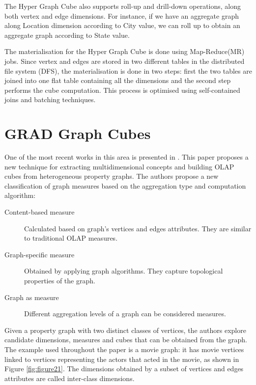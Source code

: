 The Hyper Graph Cube also supports roll-up and drill-down operations, along both vertex and edge dimensions. For instance, if we have an aggregate graph along Location dimension according to City value, we can roll up to obtain an aggregate graph according to State value.
 
The materialisation for the Hyper Graph Cube is done using Map-Reduce(MR) jobs. Since vertex and edges are stored in two different tables in the distributed file system (DFS), the materialisation is done in two steps: first the two tables are joined into one flat table containing all the dimensions and the second step performs the cube computation. This process is optimised using self-contained joins and batching techniques.

\section{GRAD Graph Cubes}

One of the most recent works in this area is presented in \cite{ghrab2015framework}. This paper proposes a new technique for extracting multidimensional concepts and building OLAP cubes from heterogeneous property graphs. The authors propose a new classification of graph measures based on the aggregation type and computation algorithm:
\begin{description}
\item[Content-based measure] Calculated based on graph's vertices and edges attributes. They are similar to traditional OLAP measures.
\item[Graph-specific measure] Obtained by applying graph algorithms. They capture topological properties of the graph.
\item[Graph as measure] Different aggregation levels of a graph can be considered measures.
\end{description}

Given a property graph with two distinct classes of vertices, the authors explore candidate dimensions, measures and cubes that can be obtained from the graph. The example used throughout the paper is a movie graph: it has movie vertices linked to vertices representing the actors that acted in the movie, as shown in Figure \ref{fig:figure21}. The dimensions obtained by a subset of vertices and edges attributes are called inter-class dimensions.

